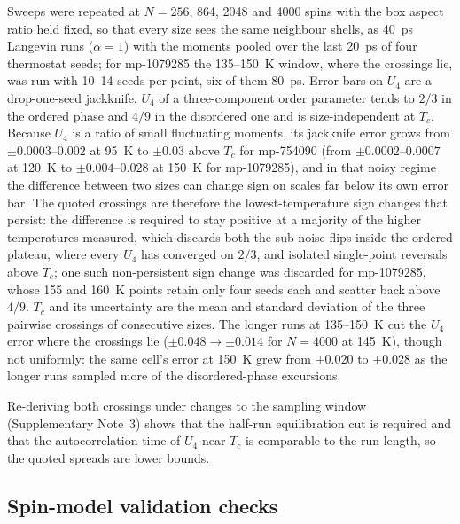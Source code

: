 \documentclass[aps,prb,preprint,superscriptaddress,longbibliography,nofootinbib]{revtex4-2}
\begin{document}
Sweeps were repeated at $N=256$, 864, 2048 and 4000 spins with the box aspect ratio held fixed, so that every
size sees the same neighbour shells, as 40~ps Langevin runs
($\alpha=1$) with the moments pooled over the last 20~ps of four thermostat seeds; for mp-1079285 the
135--150~K window, where the crossings lie, was run with 10--14 seeds per point, six of them 80~ps. Error bars
on $U_4$ are a drop-one-seed jackknife. $U_4$ of a three-component order parameter tends to $2/3$ in the
ordered phase and $4/9$ in the disordered one and is size-independent at $T_c$. Because $U_4$ is a ratio of
small fluctuating moments, its jackknife error grows from $\pm0.0003$--$0.002$ at 95~K to $\pm0.03$ above $T_c$
for mp-754090 (from $\pm0.0002$--$0.0007$ at 120~K to $\pm0.004$--$0.028$ at 150~K for mp-1079285), and in that
noisy regime the difference between two sizes can change sign on scales far below its own error bar. The
quoted crossings are therefore the lowest-temperature sign changes that persist: the difference is required
to stay positive at a majority of the higher temperatures measured, which discards both the sub-noise flips
inside the ordered plateau, where every $U_4$ has converged on $2/3$, and isolated single-point reversals above
$T_c$; one such non-persistent sign change was discarded for
mp-1079285, whose 155 and 160~K points retain only four seeds each and scatter back above $4/9$. $T_c$ and its
uncertainty are the mean and standard deviation of the three pairwise crossings of consecutive sizes. The
longer runs at 135--150~K cut the $U_4$ error where the crossings lie ($\pm0.048\rightarrow\pm0.014$ for
$N=4000$ at 145~K), though not uniformly: the same cell's error at 150~K grew from $\pm0.020$ to $\pm0.028$ as
the longer runs sampled more of the disordered-phase excursions.

Re-deriving both crossings under changes to the sampling window (Supplementary Note~3) shows that the
half-run equilibration cut is required and that the autocorrelation time of $U_4$ near $T_c$ is comparable to
the run length, so the quoted spreads are lower bounds.

\subsection*{Spin-model validation checks}
\end{document}
